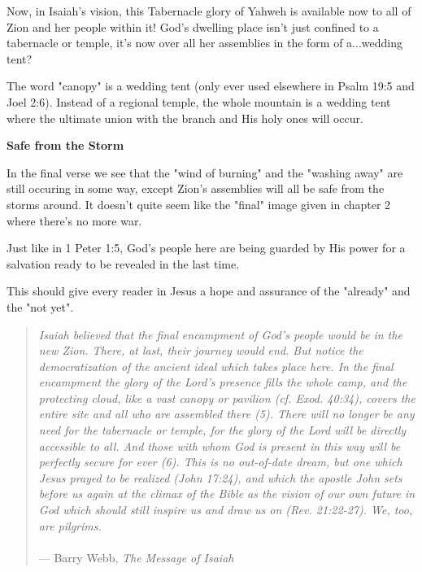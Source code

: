 \documentclass[11pt]{article}
\begin{document}
{\vspace{1em}}

Now, in Isaiah's vision, this Tabernacle glory of Yahweh is available now to all of Zion and her people within it! God's dwelling place isn't just confined to a tabernacle or temple, it's now over all her assemblies in the form of a...wedding tent?

{\vspace{1em}}

The word "canopy" is a wedding tent (only ever used elsewhere in Psalm 19:5 and Joel 2:6). Instead of a regional temple, the whole mountain is a wedding tent where the ultimate union with the branch and His holy ones will occur.

\vspace{3em}
{\large\bfseries Safe from the Storm}
\vspace{1em}

In the final verse we see that the "wind of burning" and the "washing away" are still occuring in some way, except Zion's assemblies will all be safe from the storms around. It doesn't quite seem like the "final" image given in chapter 2 where there's no more war.

Just like in 1 Peter 1:5, God's people here are being guarded by His power for a salvation ready to be revealed in the last time.

This should give every reader in Jesus a hope and assurance of the "already" and the "not yet".

\begin{quote}
\textit{
    Isaiah believed that the final encampment of God's people would be in the new Zion. There, at last, their journey would end. But notice the democratization of the ancient ideal which takes place here. In the final encampment the glory of the Lord's presence fills the whole camp, and the protecting cloud, like a vast canopy or pavilion (cf. Exod. 40:34), covers the entire site and all who are assembled there (5). There will no longer be any need for the tabernacle or temple, for the glory of the Lord will be directly accessible to all. And those with whom God is present in this way will be perfectly secure for ever (6). This is no out-of-date dream, but one which Jesus prayed to be realized (John 17:24), and which the apostle John sets before us again at the climax of the Bible as the vision of our own future in God which should still inspire us and draw us on (Rev. 21:22-27). We, too, are pilgrims.
}
\\\\
\hfill --- Barry Webb, \textit{The Message of Isaiah}
\end{quote}
\end{document}
